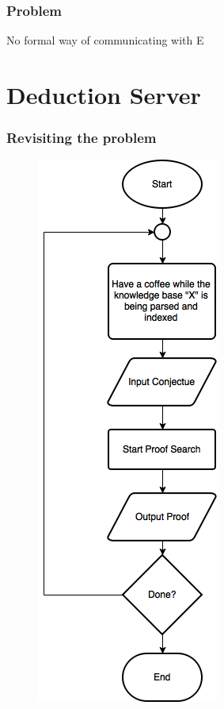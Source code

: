 \documentclass[10pt]{beamer}
\begin{document}
\begin{frame}[fragile]
  \frametitle{Problem}
  No formal way of communicating with E
\end{frame}

\section{Deduction Server}
\begin{frame}[fragile]
  \frametitle{Revisiting the problem}
\begin{figure} \includegraphics[width=\linewidth,height=0.9\textheight,keepaspectratio]{imgs/OldDeductionFC.png} \end{figure}
\end{frame}
\end{document}
